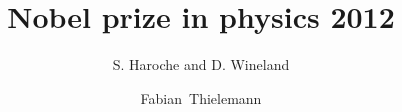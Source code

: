 \documentclass[english]{beamer}
\title[Nobelprize 2012]{Nobel prize in physics 2012}
\subtitle{S. Haroche and D. Wineland}
\author[F.~Thielemann]{Fabian~Thielemann}
\institute{Institute of Physics}
\newcommand{\backupbegin}{
   \newcounter{framenumberappendix}
   \setcounter{framenumberappendix}{\value{framenumber}}
}
\newcommand{\backupend}{
  \addtocounter{framenumberappendix}{-\value{framenumber}}
  \addtocounter{framenumber}{\value{framenumberappendix}} 
}
\begin{document}
  \begin{frame}[t]
    \titlepage
  \end{frame}
  
  
  
  
  

\end{document}
